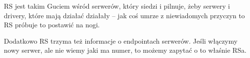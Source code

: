 RS jest takim Guciem wśród serwerów, który siedzi i pilnuje, żeby serwery i drivery, które mają działać działały -- jak coś umrze z niewiadomych przyczyn to RS próbuje to postawić na nogi.

Dodatkowo RS trzyma też informacje o endpointach serwerów. Jeśli włączymy nowy serwer, ale nie wiemy jaki ma numer, to możemy zapytać o to właśnie RSa.